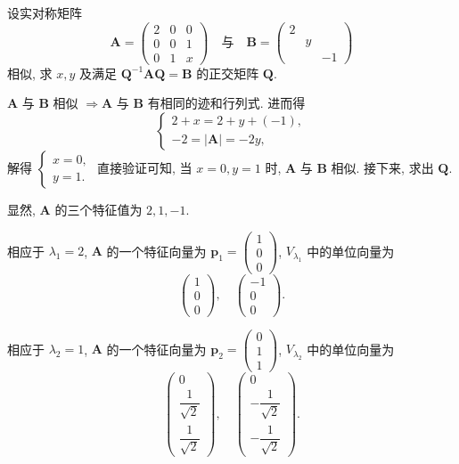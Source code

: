 \documentclass[../../main.tex]{subfiles}%
\begin{document}
\begin{example}
设实对称矩阵
\[
\boldsymbol{A} = \begin{pmatrix} 2 & 0 & 0 \\ 0 & 0 & 1 \\ 0 & 1 & x \end{pmatrix}
\quad \text{与} \quad 
\boldsymbol{B} = \begin{pmatrix} 2 &  &  \\  & y &  \\  &  & -1 \end{pmatrix}
\]
相似, 求 \( x,y \) 及满足 \( \boldsymbol{Q}^{-1}\boldsymbol{AQ} = \boldsymbol{B} \) 的正交矩阵 \( \boldsymbol{Q} \).
\end{example}
\begin{solution}
\( \boldsymbol{A} \) 与 \( \boldsymbol{B} \) 相似 \( \Rightarrow \boldsymbol{A} \) 与 \( \boldsymbol{B} \) 有相同的迹和行列式. 进而得
\[
\begin{cases}
2 + x = 2 + y + (-1), \\
-2 = |\boldsymbol{A}| = -2y,
\end{cases}
\]
解得 \( \begin{cases} x = 0, \\ y = 1. \end{cases} \) 直接验证可知, 当 \( x = 0, y = 1 \) 时, \( \boldsymbol{A} \) 与 \( \boldsymbol{B} \) 相似. 接下来, 求出 \( \boldsymbol{Q} \).

显然, \( \boldsymbol{A} \) 的三个特征值为 \( 2, 1, -1 \).

相应于 \( \lambda_1 = 2 \), \( \boldsymbol{A} \) 的一个特征向量为 \( \boldsymbol{p}_1 = \begin{pmatrix} 1 \\ 0 \\ 0 \end{pmatrix} \), \( V_{\lambda_1} \) 中的单位向量为
\[
\begin{pmatrix} 1 \\ 0 \\ 0 \end{pmatrix}, \quad \begin{pmatrix} -1 \\ 0 \\ 0 \end{pmatrix}.
\]

相应于 \( \lambda_2 = 1 \), \( \boldsymbol{A} \) 的一个特征向量为 \( \boldsymbol{p}_2 = \begin{pmatrix} 0 \\ 1 \\ 1 \end{pmatrix} \), \( V_{\lambda_2} \) 中的单位向量为
\[
\begin{pmatrix} 0 \\ \dfrac{1}{\sqrt{2}} \\ \dfrac{1}{\sqrt{2}} \end{pmatrix}, \quad \begin{pmatrix} 0 \\ -\dfrac{1}{\sqrt{2}} \\ -\dfrac{1}{\sqrt{2}} \end{pmatrix}.
\]


\end{solution}
\end{document}

